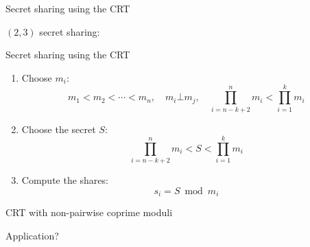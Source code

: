 \begin{frame}{Secret sharing using the CRT}
  \begin{definition}
	$(2,3)$ secret sharing:
  \end{definition}
\end{frame}
\begin{frame}{Secret sharing using the CRT}
  \begin{enumerate}
	\item Choose $m_i$:
	  \[
		m_1 < m_2 < \cdots < m_n, \quad m_i \bot m_j, \quad \prod_{i=n-k+2}^{n} m_i < \prod_{i=1}^{k} m_i
	  \]
	\item Choose the secret $S$:
	  \[
		\prod_{i=n-k+2}^{n} m_i < S < \prod_{i=1}^{k} m_i
	  \]
	\item Compute the shares:
	  \[
		s_i = S \bmod m_i
	  \]
  \end{enumerate}
\end{frame}
\begin{frame}{CRT with non-pairwise coprime moduli}
\end{frame}
\begin{frame}{Application?}
\end{frame}
